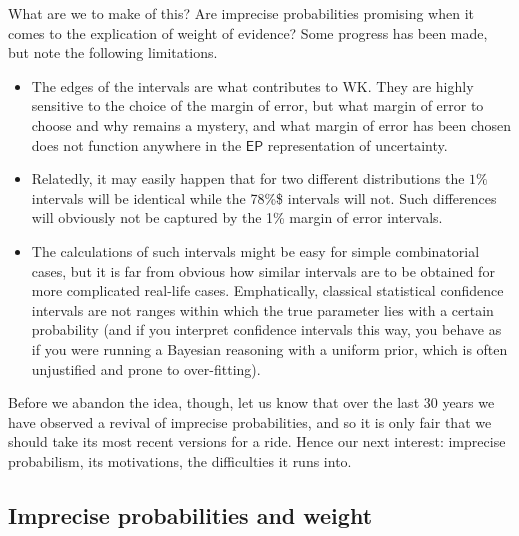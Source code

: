 \documentclass[
  10pt,
  dvipsnames,enabledeprecatedfontcommands]{scrartcl}
\begin{document}
What are we to make of this? Are imprecise probabilities promising when
it comes to the explication of weight of evidence? Some progress has
been made, but note the following limitations.

\begin{itemize}
\item
  The edges of the intervals are what contributes to \textsf{WK}. They
  are highly sensitive to the choice of the margin of error, but what
  margin of error to choose and why remains a mystery, and what margin
  of error has been chosen does not function anywhere in the
  \(\mathsf{EP}\) representation of uncertainty.
\item
  Relatedly, it may easily happen that for two different distributions
  the \(1\%\) intervals will be identical while the 78\%\$ intervals
  will not. Such differences will obviously not be captured by the 1\%
  margin of error intervals.
\item
  The calculations of such intervals might be easy for simple
  combinatorial cases, but it is far from obvious how similar intervals
  are to be obtained for more complicated real-life cases. Emphatically,
  classical statistical confidence intervals are not ranges within which
  the true parameter lies with a certain probability (and if you
  interpret confidence intervals this way, you behave as if you were
  running a Bayesian reasoning with a uniform prior, which is often
  unjustified and prone to over-fitting).
\end{itemize}

Before we abandon the idea, though, let us know that over the last 30
years we have observed a revival of imprecise probabilities, and so it
is only fair that we should take its most recent versions for a ride.
Hence our next interest: imprecise probabilism, its motivations, the
difficulties it runs into.

\hypertarget{imprecise-probabilities-and-weight}{%
\subsection{Imprecise probabilities and
weight}\label{imprecise-probabilities-and-weight}}
\end{document}

